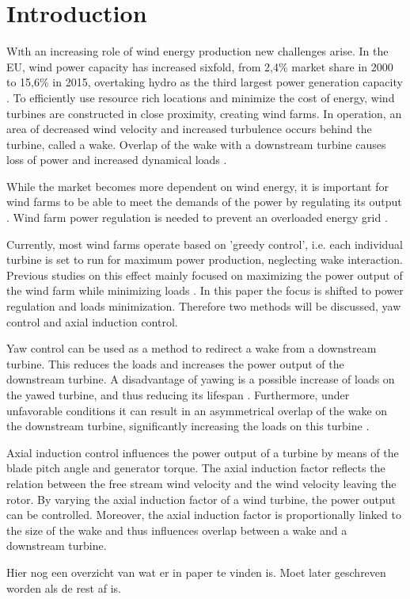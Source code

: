 \section{Introduction}
\lettrine[nindent=0em,lines=3]
With an increasing role of wind energy production new challenges arise\cite{Nat2016}. In the EU, wind power capacity has increased sixfold, from 2,4\% market share in 2000 to 15,6\% in 2015, overtaking hydro as the third largest power generation capacity \cite{EWEA2016}. To efficiently use resource rich locations and minimize the cost of energy, wind turbines are constructed in close proximity, creating wind farms. In operation, an area of decreased wind velocity and increased turbulence occurs behind the turbine, called a wake. Overlap of the wake with a downstream turbine causes loss of power and increased dynamical loads \cite{Boersma2017, Wilson2017, Dijk2016, Fleming2014, Zalkind2016}. 

While the market becomes more dependent on wind energy, it is important for wind farms to be able to meet the demands of the power by regulating its output \cite{Tande2003}. Wind farm power regulation is needed to prevent an overloaded energy grid \cite{Hansen2014}. 

Currently, most wind farms operate based on 'greedy control', i.e. each individual turbine is set to run for maximum power production, neglecting wake interaction. Previous studies on this effect mainly focused on maximizing the power output of the wind farm while minimizing loads \cite{Dijk2016, vanDijk2016, Wilson2017}. In this paper the focus is shifted to power regulation and loads minimization. Therefore two methods will be discussed, yaw control and axial induction control. 

Yaw control can be used as a method to redirect a wake from a downstream turbine. This reduces the loads and increases the power output of the downstream turbine. A disadvantage of yawing is a possible increase of loads on the yawed turbine, and thus reducing its lifespan \cite{Zalkind2016,Kanev2017}. Furthermore, under unfavorable conditions it can result in an asymmetrical overlap of the wake on the downstream turbine, significantly increasing the loads on this turbine \cite{Wilson2017,Dijk2016}. 

Axial induction control influences the power output of a turbine by means of the blade pitch angle and generator torque. The axial induction factor reflects the relation between the free stream wind velocity and the wind velocity leaving the rotor. By varying the axial induction factor of a wind turbine, the power output can be controlled. Moreover, the axial induction factor is proportionally linked to the size of the wake and thus influences overlap between a wake and a downstream turbine.  

Hier nog een overzicht van wat er in paper te vinden is. Moet later geschreven worden als de rest af is.
